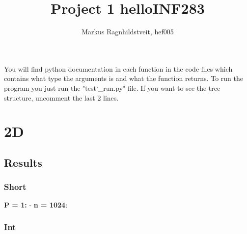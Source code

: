 \documentclass[a4paper]{extarticle}
\title{Project 1 helloINF283}
\author{Markus Ragnhildstveit, hef005}
\begin{document}
\maketitle

\tableofcontents
\newpage
You will find python documentation in each function in the code files which contains what type the arguments is and what the function returns. To run the program you just run the "test\char`_run.py" file. If you want to see the tree structure, uncomment the last 2 lines.

\section{2D}

\subsection{Results}
\subsubsection{Short}
\textbf{P = 1:}
- \textbf{n = 1024}: 



\subsubsection{Int}
\end{document}
